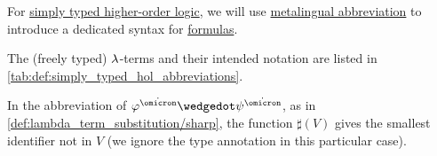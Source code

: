 \begin{definition}\label{def:simply_typed_hol_abbreviations}
  For \hyperref[def:simply_typed_hol]{simply typed higher-order logic}, we will use \hyperref[con:metalingual_abbreviation]{metalingual abbreviation} to introduce a dedicated syntax for \hyperref[def:simply_typed_hol_formula]{formulas}.

  The (freely typed) \( {\mathrm \lambda} \)-terms and their intended notation are listed in \cref{tab:def:simply_typed_hol_abbreviations}.

  In the abbreviation of \( \varphi^{\syn\omicron} \synwedge \psi^{\syn\omicron} \), as in \cref{def:lambda_term_substitution/sharp}, the function \( \sharp(V) \) gives the smallest identifier not in \( V \) (we ignore the type annotation in this particular case).


\end{definition}
